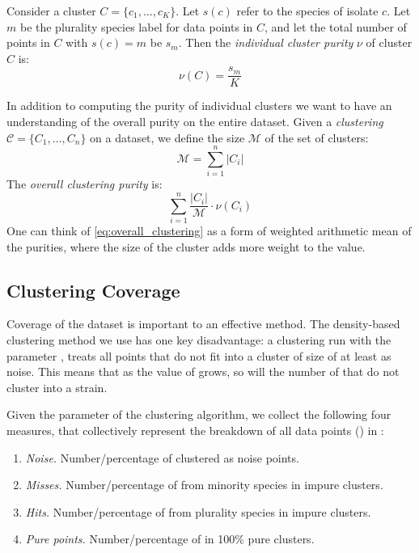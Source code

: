 Consider a cluster $C=\{c_1,\ldots, c_K\}$. Let $s(c)$ refer to the species of isolate $c$.
Let $m$ be the plurality species label for data points in $C$, and let the total number of points in
$C$ with $s(c) = m$ be $s_m$. Then the \textit{individual cluster purity} $\nu$ of cluster $C$ is:
\[
    \nu(C) = \frac{s_m}{K}
\]

In addition to computing the purity of individual clusters we want to have an understanding of the overall purity on the entire dataset.
Given a \textit{clustering} $\mathcal{C} = \{C_1,\dots,C_n\}$ on a dataset, we define the size $\mathcal{M}$ of the set of clusters: 
\begin{equation}\label{eq:num_isols}
\mathcal{M} = \sum_{i = 1}^{n} |C_i|
\end{equation}
The \textit{overall clustering purity} is:
\begin{equation}\label{eq:overall_clustering}
\sum_{i=1}^{n} \frac{|C_i|}{\mathcal{M}}\cdot\nu(C_i)
\end{equation}
One can think of \eqref{eq:overall_clustering} as a form of weighted arithmetic mean of the purities, where the size of the cluster adds more weight to the value.

\subsection{Clustering Coverage}

\label{sec:validation:coverage}
Coverage of the dataset is important to an effective \mst{} method.
The density-based clustering method we use has one key disadvantage: a clustering run  with the parameter \minneigh{}, treats all points that do not fit into a cluster of size  of at least \minneigh{} as noise.
This means that as the value of \minneigh{} grows, so will the number of \isols{} that do not cluster into a strain.

Given the parameter \minneigh{} of the clustering algorithm, we collect the following four measures, that collectively represent the breakdown of all data points (\isols{}) in \cplop{}:
\begin{enumerate}
    \item \textit{Noise.} Number/percentage of \isols{} clustered as noise points.
    \item \textit{Misses.} Number/percentage of \isols{} from  minority species
    in impure clusters.
     \item \textit{Hits.} Number/percentage of \isols{} from plurality species in
     impure clusters.
     \item \textit{Pure points.} Number/percentage of \isols{} in 100\% pure clusters.
\end{enumerate}
